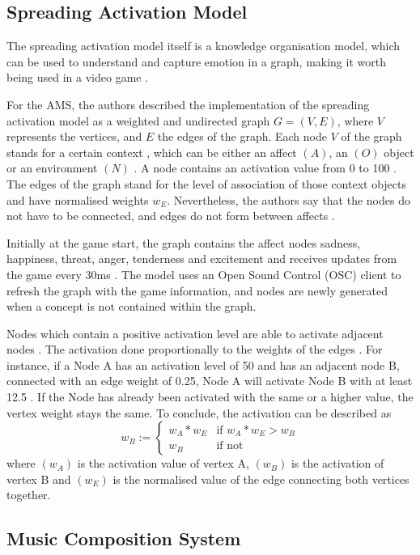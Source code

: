 \subsection{Spreading Activation Model}

The spreading activation model \cite{collins1975spreading} itself is a knowledge 
organisation model, which can be used to understand and capture emotion \cite{hutMcCormAms}\cite{carr1982words} in a graph, making it 
worth being used in a video game \cite{hutMcCormAms}.

For the AMS, the authors described the implementation
of the spreading activation model as a weighted and 
undirected graph \( G = (V, E) \)\cite{hutMcCormAms}, where 
\( V \) represents the vertices, and \( E \) the edges of the
graph. Each node \( V \) of the graph 
stands for a certain context \cite{hutMcCormAms}, which can
be either an affect \( (A) \), an  \( (O) \) object or an environment \( (N) \) \cite{hutMcCormAms}. A node
contains an activation value from 0 to 100 \cite{hutMcCormAms}. The 
edges of the graph stand for the level of  association 
of those context objects \cite{hutMcCormAms} 
and have normalised weights \( w_E\). Nevertheless, the authors
say that the nodes do not have to be connected, and edges do not 
form between affects \cite{hutMcCormAms}. 

Initially at the game
start, the graph contains the affect nodes sadness, happiness, 
threat, anger, tenderness and excitement \cite{hutMcCormAms}
and receives updates from the game every 30ms \cite{hutMcCormAms}.
The model uses an Open Sound Control (OSC) client to refresh
the graph with the game information, and nodes are newly generated
when a concept is not contained within the graph.

Nodes which contain a positive activation level are able to activate
adjacent nodes \cite{hutMcCormAms}. The activation done proportionally to the weights
of the edges \cite{hutMcCormAms}. For instance, if a Node A has an activation level
of 50 and has an adjacent node B, connected with an edge weight
of 0.25, Node A will activate Node B with at least 12.5 \cite{hutMcCormAms}. If
the Node has already been activated with the same or a higher
value, the vertex weight stays the same. To conclude, the activation
can be described as \[
w_B := 
\begin{cases} 
w_A * w_E & \text{if } w_A * w_E > w_B \\
w_B & \text{if not} 
\end{cases}
\] 
where \( (w_A) \) is the activation value of vertex A, \(( w_B )\)
is the activation of vertex B and \( (w_E) \) is the normalised value
of the edge connecting both vertices together.


\subsection{Music Composition System}

